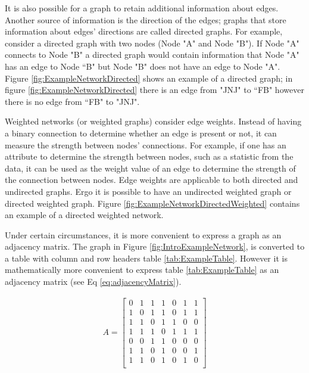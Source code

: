 It is also possible for a graph to retain additional information about edges. Another source of information is the direction of the edges; graphs that store information about edges' directions are called directed graphs. For example, consider a directed graph with two nodes (Node "A" and Node "B"). If Node "A"  connects to Node "B" a directed graph would contain information that Node "A"  has an edge to Node ``B" but Node "B" does not have an edge to Node "A".  Figure \ref{fig:ExampleNetworkDirected} shows an example of a directed graph; in figure \ref{fig:ExampleNetworkDirected} there is an edge from "JNJ" to ``FB"  however there is no edge from ``FB" to "JNJ".

Weighted networks (or weighted graphs) consider edge weights. Instead of having a binary connection to determine whether an edge is present or not, it can measure the strength between nodes' connections. For example, if one has an attribute to determine the strength between nodes, such as a statistic from the data,  it can be used as the weight value of an edge to determine the strength of the connection between nodes.  Edge weights are applicable to both directed and undirected graphs. Ergo it is possible to have an undirected weighted graph or directed weighted graph. Figure \ref{fig:ExampleNetworkDirectedWeighted} contains an example of a directed weighted network. 

Under certain circumstances, it is more convenient to express a graph as an adjacency matrix.  The graph in Figure \ref{fig:IntroExampleNetwork}, is converted to a table with column and row headers table \ref{tab:ExampleTable}. However it is mathematically more convenient to express table \ref{tab:ExampleTable} as an adjacency matrix (see Eq \ref{eq:adjacencyMatrix}).

\begin{gather}
A =
 \begin{bmatrix}
    0 & 1 & 1 & 1 & 0 & 1 & 1 \\
    1 & 0 & 1 & 1 & 0 & 1 & 1 \\
    1 & 1 & 0 & 1 & 1 & 0 & 0 \\
    1 & 1 & 1 & 0 & 1 & 1 & 1 \\
    0 & 0 & 1 & 1 & 0 & 0 & 0 \\ 
    1 & 1 & 0 & 1 & 0 & 0 & 1 \\
    1 & 1 & 0 & 1 & 0 & 1 & 0 \\
  \end{bmatrix}
  \label{eq:adjacencyMatrix}
\end{gather}

